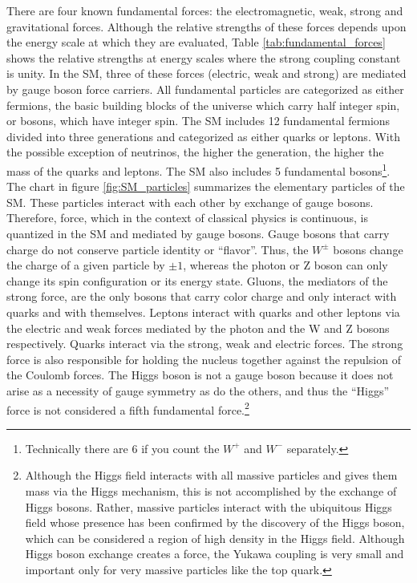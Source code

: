 There are four known fundamental forces: the electromagnetic, weak, strong and gravitational forces. Although the relative strengths of these forces depends upon the energy scale at which they are evaluated, Table \ref{tab:fundamental_forces} shows the relative strengths at energy scales where the strong coupling constant is unity. In the SM, three of these forces (electric, weak and strong) are mediated by gauge boson force carriers. All fundamental particles are categorized as either fermions, the basic building blocks of the universe which carry half integer spin, or bosons, which have integer spin. The SM includes 12 fundamental fermions divided into three generations and categorized as either quarks or leptons. With the possible exception of neutrinos, the higher the generation, the higher the mass of the quarks and leptons. The SM also includes 5 fundamental bosons\footnote{Technically there are 6 if you count the $W^+$ and $W^-$ separately.}. The chart in figure \ref{fig:SM_particles} summarizes the elementary particles of the SM. These particles interact with each other by exchange of gauge bosons. Therefore, force, which in the context of classical physics is continuous, is quantized in the SM and mediated by gauge bosons. Gauge bosons that carry charge do not conserve particle identity  or ``flavor''. Thus, the $W^{\pm}$ bosons change the charge of a given particle by $\pm1$, whereas the photon or Z boson can only change its spin configuration or its energy state. Gluons, the mediators of the strong force, are the only bosons that carry color charge and only interact with quarks and with themselves. Leptons interact with quarks and other leptons via the electric and weak forces mediated by the photon and the W and Z bosons respectively. Quarks interact via the strong, weak and electric forces. The strong force is also responsible for holding the nucleus together against the repulsion of the Coulomb forces. The Higgs boson is not a gauge boson because it does not arise as a necessity of gauge symmetry as do the others, and thus the ``Higgs'' force is not considered a fifth fundamental force.\footnote{Although the Higgs field interacts with all massive particles and gives them mass via the Higgs mechanism, this is not accomplished by the exchange of Higgs bosons. Rather, massive particles interact with the ubiquitous Higgs field whose presence has been confirmed by the discovery of the Higgs boson, which can be considered a region of high density in the Higgs field. Although Higgs boson exchange creates a force, the Yukawa coupling is very small and important only for very massive particles like the top quark.}
